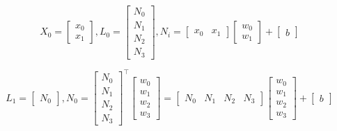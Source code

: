 \begin{equation*}
    X_0 = 
        \begin{bmatrix}
            x_0 \\
            x_1
        \end{bmatrix},
     L_0 = 
        \begin{bmatrix}
            N_0 \\
            N_1 \\
            N_2 \\
            N_3
        \end{bmatrix}, 
    N_i = 
        \begin{bmatrix}
            x_0 & x_1 
        \end{bmatrix}
        \begin{bmatrix}
            w_0 \\
            w_1
        \end{bmatrix} + 
        \begin{bmatrix}
            b
        \end{bmatrix}
\end{equation*}

\begin{equation*}
    L_1 = 
        \begin{bmatrix}
            N_0
        \end{bmatrix},
    N_0 = 
        \begin{bmatrix}
            N_0 \\
            N_1 \\
            N_2 \\
            N_3
        \end{bmatrix}^{\top}
        \begin{bmatrix}
            w_0 \\
            w_1 \\
            w_2 \\
            w_3
        \end{bmatrix}
        =
        \begin{bmatrix}
            N_0 & N_1 & N_2 & N_3
        \end{bmatrix}
        \begin{bmatrix}
            w_0 \\
            w_1 \\
            w_2 \\
            w_3
        \end{bmatrix} + 
        \begin{bmatrix}
            b
        \end{bmatrix}
\end{equation*}